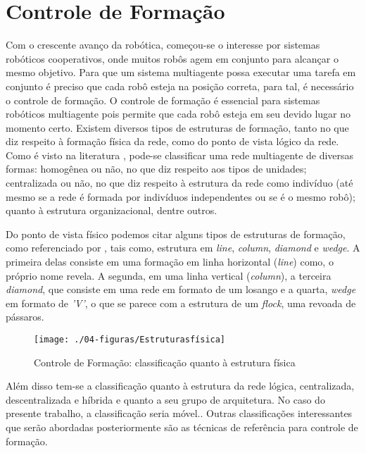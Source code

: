 \section{Controle de Formação}
\label{sec:controleFormacao}
Com o crescente avanço da robótica, começou-se o interesse por sistemas robóticos cooperativos, onde muitos robôs agem em conjunto para alcançar o mesmo objetivo. Para que um sistema multiagente possa executar uma tarefa em conjunto é preciso que cada robô esteja na posição correta, para tal, é necessário o controle de formação. O controle de formação é essencial para sistemas robóticos multiagente pois permite que cada robô esteja em seu devido lugar no momento certo. Existem diversos tipos de estruturas de formação, tanto no que diz respeito à formação física da rede, como do ponto de vista lógico da rede. Como é visto na literatura \cite{leal2009reconfigurable}, pode-se classificar uma rede multiagente de diversas formas: homogênea ou não, no que diz respeito aos tipos de unidades; centralizada ou não, no que diz respeito à estrutura da rede como indivíduo (até mesmo se a rede é formada por indivíduos independentes ou se é o mesmo robô); quanto à estrutura organizacional, dentre outros. 

Do ponto de vista físico podemos citar alguns tipos de estruturas de formação, como referenciado por , tais como, estrutura em \emph{line}, \emph{column}, \emph{diamond} e \emph{wedge}. A primeira delas consiste em uma formação em linha horizontal (\emph{line}) como, o próprio nome revela. A segunda, em uma linha vertical (\emph{column}), a terceira \emph{diamond}, que consiste em uma rede em formato de um losango e a quarta, \emph{wedge} em formato de \emph{'V'}, o que se parece com a estrutura de um \emph{flock}, uma revoada de pássaros. 

\begin{figure}[!htb]
	\centering
	\texttt{[image: ./04-figuras/Estruturasfísica]}
	\caption{Controle de Formação: classificação quanto à estrutura física}	
	\label{fig:est_fis}
\end{figure}

Além disso tem-se a classificação quanto à estrutura da rede lógica, centralizada, descentralizada e híbrida e quanto a seu grupo de arquitetura. No caso do presente trabalho, a classificação seria móvel.\cite{leal2009reconfigurable}. Outras classificações interessantes que serão abordadas posteriormente são as técnicas de referência para controle de formação.

